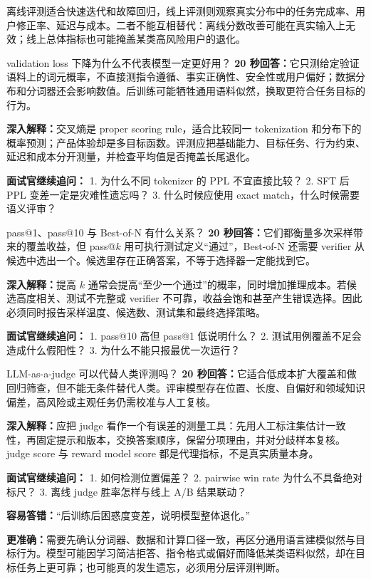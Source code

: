 离线评测适合快速迭代和故障回归，线上评测则观察真实分布中的任务完成率、用户修正率、延迟与成本。二者不能互相替代：离线分数改善可能在真实输入上无效；线上总体指标也可能掩盖某类高风险用户的退化。

\begin{interviewbox}{validation loss 下降为什么不代表模型一定更好用？}
\textbf{20 秒回答：}它只测给定验证语料上的词元概率，不直接测指令遵循、事实正确性、安全性或用户偏好；数据分布和分词器还会影响数值。后训练可能牺牲通用语料似然，换取更符合任务目标的行为。

\textbf{深入解释：}交叉熵是 proper scoring rule，适合比较同一 tokenization 和分布下的概率预测；产品体验却是多目标函数。评测应把基础能力、目标任务、行为约束、延迟和成本分开测量，并检查平均值是否掩盖长尾退化。

\textbf{面试官继续追问：}
1. 为什么不同 tokenizer 的 PPL 不宜直接比较？
2. SFT 后 PPL 变差一定是灾难性遗忘吗？
3. 什么时候应使用 exact match，什么时候需要语义评审？
\end{interviewbox}

\begin{interviewbox}{pass@1、pass@10 与 Best-of-N 有什么关系？}
\textbf{20 秒回答：}它们都衡量多次采样带来的覆盖收益，但 pass@$k$ 用可执行测试定义“通过”，Best-of-N 还需要 verifier 从候选中选出一个。候选里存在正确答案，不等于选择器一定能找到它。

\textbf{深入解释：}提高 $k$ 通常会提高“至少一个通过”的概率，同时增加推理成本。若候选高度相关、测试不完整或 verifier 不可靠，收益会饱和甚至产生错误选择。因此必须同时报告采样温度、候选数、测试集和最终选择策略。

\textbf{面试官继续追问：}
1. pass@10 高但 pass@1 低说明什么？
2. 测试用例覆盖不足会造成什么假阳性？
3. 为什么不能只报最优一次运行？
\end{interviewbox}

\begin{interviewbox}{LLM-as-a-judge 可以代替人类评测吗？}
\textbf{20 秒回答：}它适合低成本扩大覆盖和做回归筛查，但不能无条件替代人类。评审模型存在位置、长度、自偏好和领域知识偏差，高风险或主观任务仍需校准与人工复核。

\textbf{深入解释：}应把 judge 看作一个有误差的测量工具：先用人工标注集估计一致性，再固定提示和版本，交换答案顺序，保留分项理由，并对分歧样本复核。judge score 与 reward model score 都是代理指标，不是真实质量本身。

\textbf{面试官继续追问：}
1. 如何检测位置偏差？
2. pairwise win rate 为什么不具备绝对标尺？
3. 离线 judge 胜率怎样与线上 A/B 结果联动？
\end{interviewbox}

\begin{wrongbox}
\textbf{容易答错：}“后训练后困惑度变差，说明模型整体退化。”

\textbf{更准确：}需要先确认分词器、数据和计算口径一致，再区分通用语言建模似然与目标行为。模型可能因学习简洁拒答、指令格式或偏好而降低某类语料似然，却在目标任务上更可靠；也可能真的发生遗忘，必须用分层评测判断。
\end{wrongbox}
